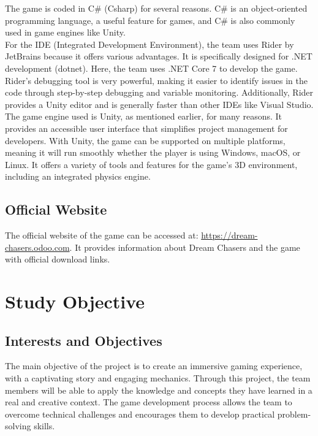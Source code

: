 \documentclass{article}
\begin{document}
The game is coded in C\# (Csharp) for several reasons. C\# is an object-oriented programming language, a useful feature for games, and C\# is also commonly used in game engines like Unity.\\

For the IDE (Integrated Development Environment), the team uses Rider by JetBrains because it offers various advantages. It is specifically designed for .NET development (dotnet). Here, the team uses .NET Core 7 to develop the game. Rider's debugging tool is very powerful, making it easier to identify issues in the code through step-by-step debugging and variable monitoring. Additionally, Rider provides a Unity editor and is generally faster than other IDEs like Visual Studio.\\

The game engine used is Unity, as mentioned earlier, for many reasons. It provides an accessible user interface that simplifies project management for developers. With Unity, the game can be supported on multiple platforms, meaning it will run smoothly whether the player is using Windows, macOS, or Linux. It offers a variety of tools and features for the game's 3D environment, including an integrated physics engine.



\subsection{Official Website}\hfill

The official website of the game can be accessed at: \url{https://dream-chasers.odoo.com}. It provides information about Dream Chasers and the game with official download links.














\newpage
\section{Study Objective}
\subsection{Interests and Objectives}\hfill

The main objective of the project is to create an immersive gaming experience, with a captivating story and engaging mechanics. Through this project, the team members will be able to apply the knowledge and concepts they have learned in a real and creative context. The game development process allows the team to overcome technical challenges and encourages them to develop practical problem-solving skills.
\end{document}
